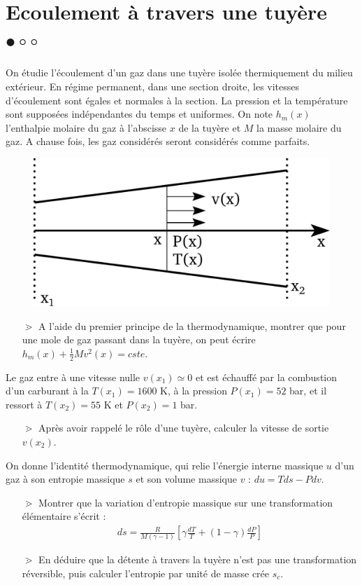 \documentclass{report}
\begin{document}
\section*{Ecoulement à travers une tuyère $\bullet\circ\circ$}

On étudie l'écoulement d'un gaz dans une tuyère isolée thermiquement du milieu extérieur. En régime permanent, dans une section droite, les vitesses d'écoulement sont égales et normales à la section. La pression et la température sont supposées indépendantes du temps et uniformes. On note $h_{m}(x)$ l'enthalpie molaire du gaz à l'abscisse $x$ de la tuyère et $M$ la masse molaire du gaz. A chause fois, les gaz considérés seront considérés comme parfaits.

\begin{figure}[!h]
\centering
\includegraphics[width=0.4\linewidth]{turbine.pdf}
\end{figure}

\begin{itemize}

\item[$\gtrdot$] A l'aide du premier principe de la thermodynamique, montrer que pour une mole de gaz passant dans la tuyère, on peut écrire $h_{m}(x)+\frac{1}{2}Mv^{2}(x)= cste$.

\end{itemize}

Le gaz entre à une vitesse nulle $v(x_1)\simeq0$ et est échauffé par la combustion d'un carburant à la $T(x_1)=1600$ K, à la pression $P(x_1)=52$ bar, et il ressort à $T(x_2)=55$ K et $P(x_2)=1$ bar.

\begin{itemize}
\item[$\gtrdot$] Après avoir rappelé le rôle d'une tuyère, calculer la vitesse de sortie  $v(x_{2})$.
\end{itemize}

On donne l'identité thermodynamique, qui relie l'énergie interne massique $u$ d'un gaz à son entropie massique $s$ et son volume massique $v$ : $du=Tds - Pdv$.

\begin{itemize}
\item[$\gtrdot$] Montrer que la variation d'entropie massique sur une transformation élémentaire s'écrit :
\begin{align*}
	ds=\frac{R}{M(\gamma-1)}\left[\gamma\frac{dT}{T}+(1-\gamma)\frac{dP}{P} \right] 
\end{align*}
\item[$\gtrdot$] En déduire que la détente à travers la tuyère n'est pas une transformation réversible, puis calculer l'entropie par unité de masse crée $s_c$.
\end{itemize}
\end{document}
